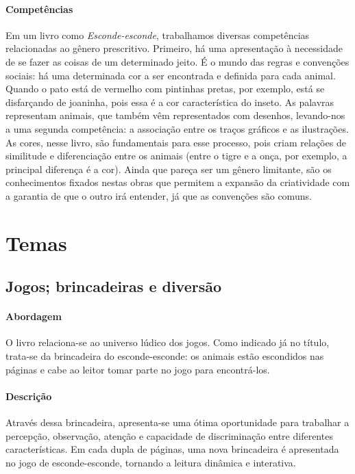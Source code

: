 \documentclass[11pt]{extarticle}
\begin{document}
\paragraph{Competências} Em um livro como
\emph{Esconde-esconde}, trabalhamos diversas competências relacionadas ao gênero prescritivo. 
Primeiro, há uma apresentação à necessidade de se fazer as coisas de um 
determinado jeito. É o mundo das regras e convenções sociais: há uma determinada cor a ser encontrada e definida para cada animal. Quando o pato está de vermelho com pintinhas pretas, por exemplo, está se disfarçando de joaninha, pois essa é a cor característica do inseto. As palavras representam animais, que também vêm representados com desenhos, levando-nos a uma segunda competência: a associação entre os traços gráficos e as ilustrações. As cores, nesse livro, são fundamentais para esse processo, pois criam relações de similitude e diferenciação entre os animais (entre o tigre e a onça, por exemplo, a principal diferença é a cor). Ainda que pareça ser um gênero
limitante, são os conhecimentos fixados nestas obras que permitem a expansão
da criatividade com a garantia de que o outro irá entender, já que as convenções são comuns.


\section{Temas}

\subsection{Jogos; brincadeiras e diversão}

\paragraph{Abordagem} O livro relaciona-se ao universo lúdico dos jogos. Como indicado já no título, trata-se da brincadeira do esconde-esconde: os animais estão escondidos nas páginas e cabe ao leitor tomar parte no jogo para encontrá-los.

\paragraph{Descrição} Através dessa brincadeira, apresenta-se uma ótima oportunidade para trabalhar a percepção, observação, atenção e capacidade de discriminação entre diferentes características. Em cada dupla de páginas, uma nova brincadeira é apresentada no jogo de esconde-esconde, tornando a leitura dinâmica e interativa.
\end{document}
